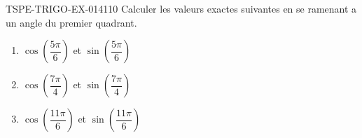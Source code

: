 \begin{exercice}{TSPE-TRIGO-EX-014}{1}{10}
Calculer les valeurs exactes suivantes en se ramenant a un angle du premier quadrant.
\begin{enumerate}
  \item $\cos\!\left(\dfrac{5\pi}{6}\right)$ et $\sin\!\left(\dfrac{5\pi}{6}\right)$
  \item $\cos\!\left(\dfrac{7\pi}{4}\right)$ et $\sin\!\left(\dfrac{7\pi}{4}\right)$
  \item $\cos\!\left(\dfrac{11\pi}{6}\right)$ et $\sin\!\left(\dfrac{11\pi}{6}\right)$
\end{enumerate}
\end{exercice}
